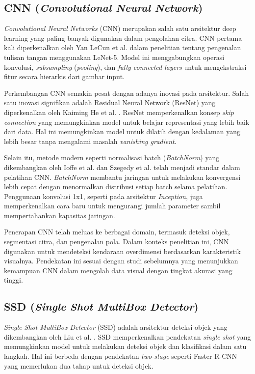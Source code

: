 \subsection{CNN (\emph{Convolutional Neural Network})}
\emph{Convolutional Neural Networks} (CNN) merupakan salah satu arsitektur deep learning yang paling banyak digunakan dalam pengolahan citra. CNN pertama kali diperkenalkan oleh Yan LeCun et al. \parencite*{yannlecun1998} dalam penelitian tentang pengenalan tulisan tangan menggunakan LeNet-5. Model ini menggabungkan operasi konvolusi, \emph{subsampling} (\emph{pooling}), dan \emph{fully connected layers} untuk mengekstraksi fitur secara hierarkis dari gambar input.

Perkembangan CNN semakin pesat dengan adanya inovasi pada arsitektur. Salah satu inovasi signifikan adalah Residual Neural Network (ResNet) yang diperkenalkan oleh Kaiming He et al. \parencite*{kaiminghe2015}. ResNet memperkenalkan konsep \emph{skip connection} yang memungkinkan model untuk belajar representasi yang lebih baik dari data. Hal ini memungkinkan model untuk dilatih dengan kedalaman yang lebih besar tanpa mengalami masalah \emph{vanishing gradient}.

Selain itu, metode modern seperti normalisasi batch (\emph{BatchNorm}) yang dikembangkan oleh Ioffe et al. \parencite*{ioffe2015} dan Szegedy et al. \parencite*{szegedy2015} telah menjadi standar dalam pelatihan CNN. \emph{BatchNorm} membantu jaringan untuk melakukan konvergensi lebih cepat dengan menormalkan distribusi setiap batch selama pelatihan. Penggunaan konvolusi 1x1, seperti pada arsitektur \emph{Inception}, juga memperkenalkan cara baru untuk mengurangi jumlah parameter sambil mempertahankan kapasitas jaringan.

Penerapan CNN telah meluas ke berbagai domain, termasuk deteksi objek, segmentasi citra, dan pengenalan pola. Dalam konteks penelitian ini, CNN digunakan untuk mendeteksi kendaraan overdimensi berdasarkan karakteristik visualnya. Pendekatan ini sesuai dengan studi sebelumnya yang menunjukkan kemampuan CNN dalam mengolah data visual dengan tingkat akurasi yang tinggi.

\subsection{SSD (\emph{Single Shot MultiBox Detector})}

\emph{Single Shot MultiBox Detector} (SSD) adalah arsitektur deteksi objek yang dikembangkan oleh Liu et al. \parencite*{liu2016}. SSD memperkenalkan pendekatan \emph{single shot} yang memungkinkan model untuk melakukan deteksi objek dan klasifikasi dalam satu langkah. Hal ini berbeda dengan pendekatan \emph{two-stage} seperti Faster R-CNN yang memerlukan dua tahap untuk deteksi objek.

